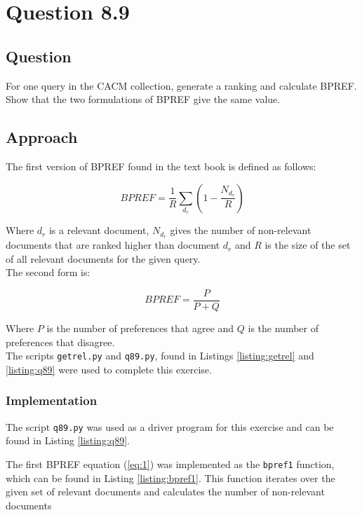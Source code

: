 \section{Question 8.9}

\subsection{Question}
For one query in the CACM collection, generate a ranking and calculate BPREF. Show that the two formulations of BPREF give the same value.

\subsection{Approach}
The first version of BPREF found in the text book is defined as follows:

\begin{equation}
\label{eq:1}
BPREF = \frac{1}{R} \sum_{d_r}(1 - \frac{N_{d_r}}{R})
\end{equation}

Where \(d_r\) is a relevant document, \(N_{d_r}\) gives the number of non-relevant documents that are ranked higher than document \(d_r\) and \(R\) is the size of the set of all relevant documents for the given query.\\

The second form is:

\begin{equation}
\label{eq:2}
BPREF = \frac{P}{P + Q}
\end{equation}


Where \(P\) is the number of preferences that agree and \(Q\) is the number of preferences that disagree.\\

The scripts \texttt{getrel.py} and \texttt{q89.py}, found in Listings \ref{listing:getrel} and \ref{listing:q89} were used to complete this exercise.

\subsubsection{Implementation}
The script \texttt{q89.py} was used as a driver program for this exercise and can be found in Listing \ref{listing:q89}.

The first BPREF equation (\ref{eq:1}) was implemented as the \texttt{bpref1} function, which can be found in Listing \ref{listing:bpref1}.  This function iterates over the given set of relevant documents and calculates the number of non-relevant documents 

